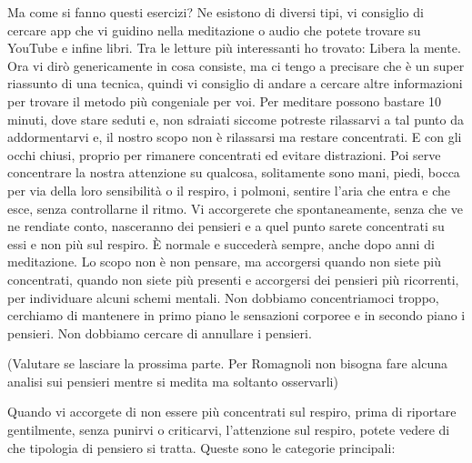 \documentclass[12pt]{book} %
\begin{document}
Ma come si fanno questi esercizi? Ne esistono di diversi tipi, vi consiglio di cercare app che vi guidino nella
meditazione o audio che potete trovare su YouTube e infine libri. Tra le letture più interessanti ho trovato: Libera la
mente. Ora vi dirò
genericamente in cosa consiste, ma ci tengo a precisare che è un super riassunto di una tecnica, quindi vi consiglio di
andare a cercare altre informazioni per trovare il metodo più congeniale per voi. Per meditare possono bastare 10
minuti, dove stare seduti e, non sdraiati siccome potreste rilassarvi a tal punto da addormentarvi e, il nostro scopo
non è rilassarsi ma restare concentrati. E con gli occhi chiusi, proprio per rimanere concentrati ed evitare
distrazioni. Poi serve concentrare la nostra attenzione su qualcosa, solitamente sono mani, piedi, bocca per via della
loro sensibilità o il respiro, i polmoni, sentire l'aria che entra e che esce, senza controllarne
il ritmo. Vi accorgerete che spontaneamente, senza che ve ne rendiate conto, nasceranno dei pensieri e a quel punto
sarete concentrati su essi e non più sul respiro. È normale e succederà sempre, anche dopo anni di meditazione. Lo
scopo non è non pensare, ma accorgersi quando non siete più concentrati, quando non siete più presenti e accorgersi dei
pensieri più ricorrenti, per individuare alcuni schemi mentali. Non dobbiamo concentriamoci troppo, cerchiamo di mantenere in primo piano le sensazioni corporee e in secondo piano i pensieri. Non dobbiamo cercare di annullare i pensieri.

(Valutare se lasciare la prossima parte. Per Romagnoli non bisogna fare alcuna analisi sui pensieri mentre si medita ma
soltanto osservarli)

Quando vi accorgete di non essere più concentrati sul respiro, prima di riportare gentilmente, senza punirvi o
criticarvi, l'attenzione sul respiro, potete vedere di che tipologia di pensiero si tratta. Queste
sono le categorie principali:
\end{document}
